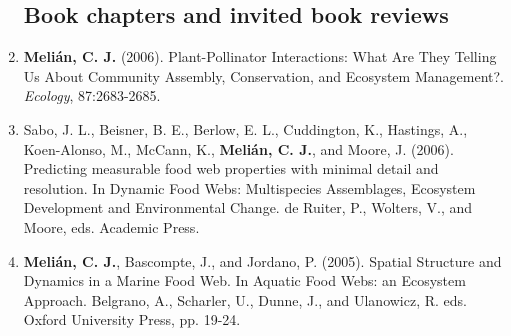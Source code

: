 \documentclass[12pt]{article}
\begin{document}
\begin{flushleft}
\begin{enumerate}
\subsection{Book chapters and invited book reviews}
\item {\bf Meli\'an, C. J.} (2006). Plant-Pollinator Interactions: What Are They Telling Us About Community Assembly, Conservation, and Ecosystem Management?. {\em Ecology}, 87:2683-2685.\\
\item Sabo, J. L., Beisner, B. E., Berlow, E. L., Cuddington, K., Hastings, A., Koen-Alonso, M., McCann, K., {\bf Meli\'an, C. J.}, and Moore, J. (2006). Predicting measurable food web properties with minimal detail and resolution. In Dynamic Food Webs: Multispecies Assemblages, Ecosystem Development and Environmental Change. de Ruiter, P., Wolters, V., and Moore, eds. Academic Press.\\
\item {\bf Meli\'an, C. J.}, Bascompte, J., and Jordano, P. (2005). Spatial Structure and Dynamics in a Marine Food Web. In Aquatic Food Webs: an Ecosystem Approach. Belgrano, A., Scharler, U., Dunne, J., and Ulanowicz, R. eds. Oxford University Press, pp. 19-24.\\


\end{enumerate}
\end{flushleft}
\end{document}
